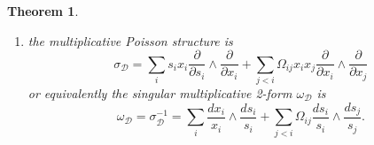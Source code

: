 \documentclass{amsart}
\newtheorem{theorem}{Theorem}[section]
\numberwithin{equation}{section}
\newcommand{\cD}{\mathcal{D}}
\begin{document}
\begin{theorem}
\begin{enumerate}
\[\begin{aligned}
        \end{aligned}\]
    \item the multiplicative Poisson structure is
    \begin{equation}
    \label{eq:2-formGX}
		\sigma_\cD =\sum_{i} s_ix_i\frac{\partial}{\partial s_i} \wedge \frac{\partial}{\partial x_i}+\sum_{j < i} \Omega_{ij}x_ix_j \frac{\partial}{\partial x_i} \wedge \frac{\partial}{\partial x_j}
    \end{equation}
    or equivalently the singular multiplicative 2-form $\omega_\cD$ is
      \begin{equation} 
	\omega_\cD = \sigma_\cD^{-1} = \sum_{i} \frac{dx_i}{x_i} \wedge \frac{ds_i}{s_i} + \sum_{j < i} \Omega_{ij} \frac{ds_i}{s_i} \wedge \frac{ds_j}{s_j}.
      \end{equation}
  \end{enumerate}
\end{theorem}
\end{document}
